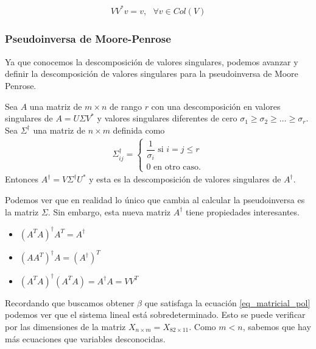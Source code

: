 \begin{equation*}
    \begin{aligned}
    V V^{*} v = v, \text{ } \forall v \in Col (V)
    \end{aligned}
\end{equation*}

\subsubsection{Pseudoinversa de Moore-Penrose}

Ya que conocemos la descomposición de valores singulares, podemos avanzar y definir la descomposición de valores singulares para la pseudoinversa de Moore Penrose. 

\begin{theorem}
Sea $A$ una matriz de $m \times n$ de rango $r$ con una descomposición en valores singulares de $A = U \Sigma V^{*}$ y valores singulares diferentes de cero $\sigma_1 \geq \sigma_2 \geq \dots \geq \sigma_r$. Sea $\Sigma^{\dagger}$ una matriz de $n \times m$ definida como
\begin{equation*}
    \begin{aligned}
   \Sigma^{\dagger}_{ij} =
   \begin{cases}
   \dfrac{1}{\sigma_i} \text{ si } i = j \leq r\\
   0 \text{ en otro caso.}
   \end{cases}
    \end{aligned}
\end{equation*}
Entonces $A^{\dagger} = V \Sigma^{\dagger} U ^{*}$ y esta es la descomposición de valores singulares de $A^{\dagger}$. 
\cite{friedberglinearalgebra}
\end{theorem}

Podemos ver que en realidad lo único que cambia al calcular la pseudoinversa es la matriz $\Sigma$. Sin embargo, esta nueva matriz $A^{\dagger}$ tiene propiedades interesantes. 

\begin{itemize}
    \item $(A^{T}A)^{\dagger} A^{T} = A^{\dagger}$
    \item $(AA^{T})^{\dagger} A = (A^{\dagger})^{T}$
    \item $(A^{T}A)^{\dagger}(A^{T}A) = A^{\dagger}A = VV^{T}$
\end{itemize}


Recordando que buscamos obtener $\beta$ que satisfaga la ecuación \ref{eq_matricial_pol} podemos ver que el sistema lineal está sobredeterminado. Esto se puede verificar por las dimensiones de la matriz $X_{n \times m} = X_{82 \times 11}$. Como $m < n$, sabemos que hay más ecuaciones que variables desconocidas. 

